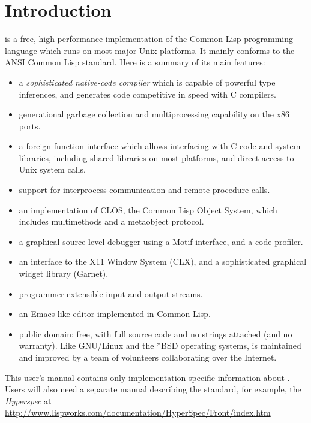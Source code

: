 \chapter{Introduction}

\cmucl{} is a free, high-performance implementation of the Common Lisp
programming language which runs on most major Unix platforms. It
mainly conforms to the ANSI Common Lisp standard. Here is a summary of
its main features:

\begin{itemize}
\item a {\em sophisticated native-code compiler} which is capable of
powerful type inferences, and generates code competitive in speed with
C compilers.

\item generational garbage collection and multiprocessing
capability on the x86 ports.

\item a foreign function interface which allows interfacing with C code and
system libraries, including shared libraries on most platforms, and
direct access to Unix system calls.

\item support for interprocess communication and remote procedure
calls.
     
\item an implementation of CLOS, the Common Lisp Object System, which
includes multimethods and a metaobject protocol.

\item a graphical source-level debugger using a Motif interface, and a
code profiler.

\item an interface to the X11 Window System (CLX), and a sophisticated
graphical widget library (Garnet).

\item programmer-extensible input and output streams.
                        
\item an Emacs-like editor implemented in Common Lisp.

\item public domain: free, with full source code and no
strings attached (and no warranty).  Like GNU/Linux and the *BSD
operating systems, \cmucl{} is maintained and improved by a team of
volunteers collaborating over the Internet.
\end{itemize}


This user's manual contains only implementation-specific information
about \cmucl. Users will also need a separate manual describing the
\clisp{} standard, for example, the
\emph{Hyperspec} at \url{http://www.lispworks.com/documentation/HyperSpec/Front/index.htm}


